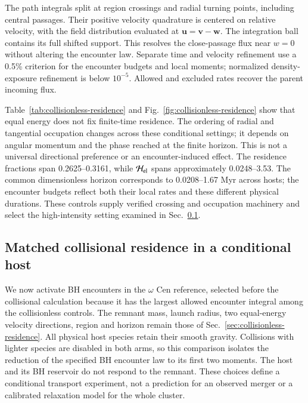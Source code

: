 \documentclass[aps,prd,reprint,amsmath,amssymb,superscriptaddress,nofootinbib,longbibliography,floatfix]{revtex4-2}
\begin{document}
The path integrals split at region crossings and radial turning points, including central passages. Their positive velocity quadrature is centered on relative velocity, with the field distribution evaluated at $\mathbf u=\mathbf v-\mathbf w$. The integration ball contains its full shifted support. This resolves the close-passage flux near $w=0$ without altering the encounter law. Separate time and velocity refinement use a 0.5\% criterion for the encounter budgets and local moments; normalized density-exposure refinement is below $10^{-5}$. Allowed and excluded rates recover the parent incoming flux.

Table~\ref{tab:collisionless-residence} and Fig.~\ref{fig:collisionless-residence} show that equal energy does not fix finite-time residence. The ordering of radial and tangential occupation changes across these conditional settings; it depends on angular momentum and the phase reached at the finite horizon. This is not a universal directional preference or an encounter-induced effect. The residence fractions span 0.2625--0.3161, while $\mathcal H_{\rm el}$ spans approximately 0.0248--3.53. The common dimensionless horizon corresponds to 0.0208--1.67 Myr across hosts; the encounter budgets reflect both their local rates and these different physical durations. These controls supply verified crossing and occupation machinery and select the high-intensity setting examined in Sec.~\ref{sec:matched-pilot}.

\subsection{Matched collisional residence in a conditional host}\label{sec:matched-pilot}

We now activate BH encounters in the $\omega$ Cen reference, selected before the collisional calculation because it has the largest allowed encounter integral among the collisionless controls. The remnant mass, launch radius, two equal-energy velocity directions, region and horizon remain those of Sec.~\ref{sec:collisionless-residence}. All physical host species retain their smooth gravity. Collisions with lighter species are disabled in both arms, so this comparison isolates the reduction of the specified BH encounter law to its first two moments. The host and its BH reservoir do not respond to the remnant. These choices define a conditional transport experiment, not a prediction for an observed merger or a calibrated relaxation model for the whole cluster.
\end{document}
